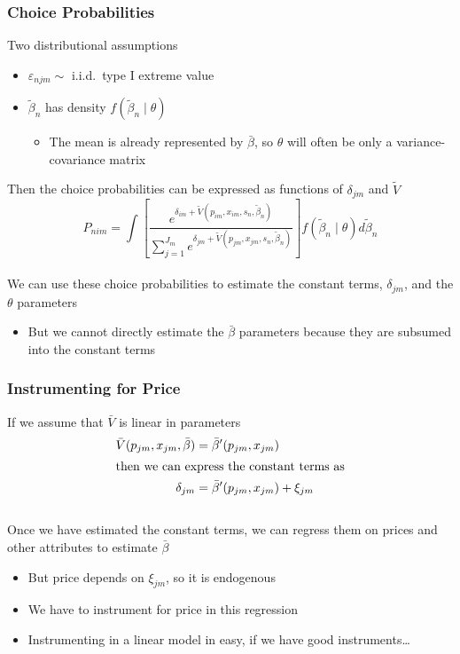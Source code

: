 \documentclass{beamer}
\begin{document}
\begin{frame}\frametitle{Choice Probabilities}
    Two distributional assumptions
    \begin{itemize}
        \item $\varepsilon_{njm} \sim$ i.i.d.\ type I extreme value
        \item $\tilde{\beta}_n$ has density $f(\tilde{\beta}_n \mid \theta)$
        \begin{itemize}
            \item The mean is already represented by $\bar{\beta}$, so $\theta$ will often be only a variance-covariance matrix
        \end{itemize}
    \end{itemize}
    \vspace{2ex}
    Then the choice probabilities can be expressed as functions of $\delta_{jm}$ and $\tilde{V}$
    $$P_{nim} = \int \left[ \frac{e^{\delta_{im} + \tilde{V}(p_{im}, x_{im}, s_n, \tilde{\beta}_n)}}{\sum_{j = 1}^{J_m} e^{\delta_{jm} + \tilde{V}(p_{jm}, x_{jm}, s_n, \tilde{\beta}_n)}} \right] f(\tilde{\beta}_n \mid \theta) d \tilde{\beta}_n$$ \\
    \vspace{2ex}
    We can use these choice probabilities to estimate the constant terms, $\delta_{jm}$, and the $\theta$ parameters
    \begin{itemize}
        \item But we cannot directly estimate the $\bar{\beta}$ parameters because they are subsumed into the constant terms
    \end{itemize}
\end{frame}

\begin{frame}\frametitle{Instrumenting for Price}
    If we assume that $\bar{V}$ is linear in parameters
    \begin{align*}
        \bar{V}(p_{jm}, x_{jm}, \bar{\beta}) &= \bar{\beta}' (p_{jm}, x_{jm}) \\
        \intertext{then we can express the constant terms as}
        \delta_{jm} &= \bar{\beta}' (p_{jm}, x_{jm}) + \xi_{jm}
    \end{align*} \\
    \vspace{2ex}
    Once we have estimated the constant terms, we can regress them on prices and other attributes to estimate $\bar{\beta}$
    \begin{itemize}
        \item But price depends on $\xi_{jm}$, so it is endogenous
        \item We have to instrument for price in this regression
        \item Instrumenting in a linear model in easy, if we have good instruments\ldots
    \end{itemize}
\end{frame}
\end{document}
